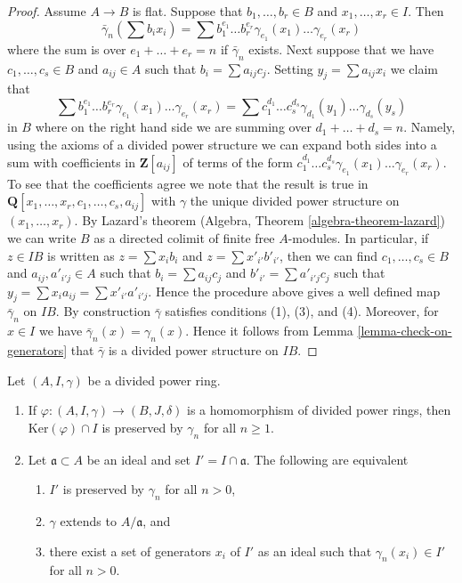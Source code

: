 \begin{proof}
\medskip\noindent
Assume $A \to B$ is flat. Suppose that $b_1, \ldots, b_r \in B$ and
$x_1, \ldots, x_r \in I$. Then
$$
\bar\gamma_n(\sum b_ix_i) =
\sum b_1^{e_1} \ldots b_r^{e_r} \gamma_{e_1}(x_1) \ldots \gamma_{e_r}(x_r)
$$
where the sum is over $e_1 + \ldots + e_r = n$
if $\bar\gamma_n$ exists. Next suppose that we have $c_1, \ldots, c_s \in B$
and $a_{ij} \in A$ such that $b_i = \sum a_{ij}c_j$.
Setting $y_j = \sum a_{ij}x_i$ we claim that
$$
\sum b_1^{e_1} \ldots b_r^{e_r} \gamma_{e_1}(x_1) \ldots \gamma_{e_r}(x_r) =
\sum c_1^{d_1} \ldots c_s^{d_s} \gamma_{d_1}(y_1) \ldots \gamma_{d_s}(y_s)
$$
in $B$ where on the right hand side we are summing over
$d_1 + \ldots + d_s = n$. Namely, using the axioms of a divided power
structure we can expand both sides into a sum with coefficients
in $\mathbf{Z}[a_{ij}]$ of terms of the form 
$c_1^{d_1} \ldots c_s^{d_s}\gamma_{e_1}(x_1) \ldots \gamma_{e_r}(x_r)$.
To see that the coefficients agree we note that the result is true
in $\mathbf{Q}[x_1, \ldots, x_r, c_1, \ldots, c_s, a_{ij}]$ with
$\gamma$ the unique divided power structure on $(x_1, \ldots, x_r)$.
By Lazard's theorem (Algebra, Theorem \ref{algebra-theorem-lazard})
we can write $B$ as a directed colimit of finite free $A$-modules.
In particular, if $z \in IB$ is written as $z = \sum x_ib_i$ and
$z = \sum x'_{i'}b'_{i'}$, then we can find $c_1, \ldots, c_s \in B$
and $a_{ij}, a'_{i'j} \in A$ such that $b_i = \sum a_{ij}c_j$
and $b'_{i'} = \sum a'_{i'j}c_j$ such that
$y_j = \sum x_ia_{ij} = \sum x'_{i'}a'_{i'j}$.
Hence the procedure above gives a well defined map $\bar\gamma_n$
on $IB$. By construction $\bar\gamma$ satisfies conditions (1), (3), and
(4). Moreover, for $x \in I$ we have $\bar\gamma_n(x) = \gamma_n(x)$. Hence
it follows from Lemma \ref{lemma-check-on-generators} that $\bar\gamma$
is a divided power structure on $IB$.
\end{proof}

\begin{lemma}
\label{lemma-kernel}
Let $(A, I, \gamma)$ be a divided power ring.
\begin{enumerate}
\item If $\varphi : (A, I, \gamma) \to (B, J, \delta)$ is a
homomorphism of divided power rings, then $\text{Ker}(\varphi) \cap I$
is preserved by $\gamma_n$ for all $n \geq 1$.
\item Let $\mathfrak a \subset A$ be an ideal and set
$I' = I \cap \mathfrak a$. The following are equivalent
\begin{enumerate}
\item $I'$ is preserved by $\gamma_n$ for all $n > 0$,
\item $\gamma$ extends to $A/\mathfrak a$, and
\item there exist a set of generators $x_i$ of $I'$ as an ideal
such that $\gamma_n(x_i) \in I'$ for all $n > 0$.
\end{enumerate}
\end{enumerate}
\end{lemma}


